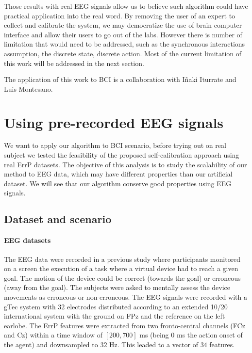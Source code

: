 Those results with real EEG signals allow us to believe such algorithm could have practical application into the real word. By removing the user of an expert to collect and calibrate the system, we may democratize the use of brain computer interface and allow their users to go out of the labs. However there is number of limitation that would need to be addressed, such as the synchronous interactions assumption, the discrete state, discrete action. Most of the current limitation of this work will be addressed in the next section.

The application of this work to BCI is a collaboration with I{\~n}aki Iturrate and Luis Montesano.

\section{Using pre-recorded EEG signals}

We want to apply our algorithm to BCI scenario, before trying out on real subject we tested the feasibility of the proposed self-calibration approach using real ErrP datasets. The objective of this analysis is to study the scalability of our method to EEG data, which may have different properties than our artificial dataset. We will see that our algorithm conserve good properties using EEG signals.

\subsection{Dataset and scenario}

\paragraph{EEG datasets}  The EEG data were recorded in a previous study \cite{iturrate2013task} where participants monitored on a screen the execution of a task where a virtual device had to reach a given goal. The motion of the device could be correct (towards the goal) or erroneous (away from the goal). The subjects were asked to mentally assess the device movements as erroneous or non-erroneous. The EEG signals were recorded with a gTec system with 32 electrodes distributed according to an extended 10/20 international system with the ground on FPz and the reference on the left earlobe. The ErrP features were extracted from two fronto-central channels (FCz and Cz) within a time window of $[200,700]$ ms (being 0 ms the action onset of the agent) and downsampled to $32$ Hz. This leaded to a vector of $34$ features.

